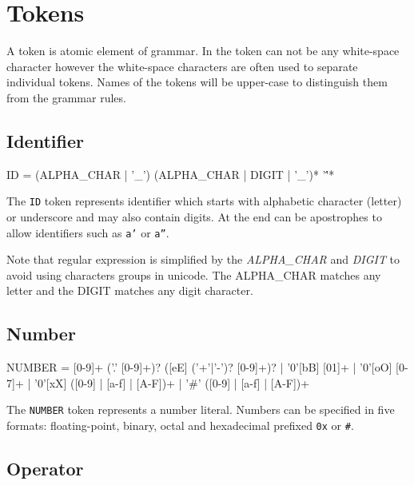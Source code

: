 \section{Tokens}

A token is atomic element of grammar.
In the token can not be any white-space character however the white-space characters are often used to separate individual tokens.
Names of the tokens will be upper-case to distinguish them from the grammar rules.


\subsection{Identifier}
\begin{Grammar}
ID = (ALPHA_CHAR | '_') (ALPHA_CHAR | DIGIT | '_')* '\''*
\end{Grammar}

The \texttt{ID} token represents identifier which starts with alphabetic character (letter) or underscore and may also contain digits.
At the end can be apostrophes to allow identifiers such as \texttt{a'} or \texttt{a''}.

Note that regular expression is simplified by the \emph{ALPHA\_CHAR} and \emph{DIGIT} to avoid using characters groups in unicode.
The ALPHA\_CHAR matches any letter and the DIGIT matches any digit character.


\subsection{Number}
\begin{Grammar}
NUMBER = [0-9]+ ('.' [0-9]+)? ([eE] ('+'|'-')? [0-9]+)?
	| '0'[bB] [01]+
	| '0'[oO] [0-7]+
	| '0'[xX] ([0-9] | [a-f] | [A-F])+
	| '#' ([0-9] | [a-f] | [A-F])+
\end{Grammar}

The \texttt{NUMBER} token represents a number literal.
Numbers can be specified in five formats: floating-point, binary, octal and hexadecimal prefixed \texttt{0x} or \texttt{\#}.


\subsection{Operator}

